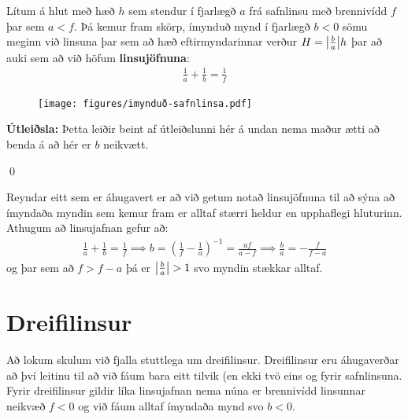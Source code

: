 \ifdefined \wholebook \else\documentclass[oneside]{book}\usepackage{EdlBook}\graphicspath{{figures/}}
\begin{document}
\begin{tcolorbox}
\begin{theorem}
Lítum á hlut með hæð $h$ sem stendur í fjarlægð $a$ frá safnlinsu með brennivídd $f$ þar sem $a < f$. Þá kemur fram skörp, ímynduð mynd í fjarlægð $b < 0$ sömu meginn við linsuna þar sem að hæð eftirmyndarinnar verður $H = \abs{\frac{b}{a}}h$ þar að auki sem að við höfum \textbf{linsujöfnuna}:
\begin{align*}
    \frac{1}{a} + \frac{1}{b} = \frac{1}{f}
\end{align*}
\begin{figure}[H]
    \centering
    \texttt{[image: figures/imynduð-safnlinsa.pdf]}
\end{figure}
\end{theorem}
\end{tcolorbox}

\textbf{Útleiðsla:} Þetta leiðir beint af útleiðslunni hér á undan nema maður ætti að benda á að hér er $b$ neikvætt.

\qed

Reyndar eitt sem er áhugavert er að við getum notað linsujöfnuna til að sýna að ímyndaða myndin sem kemur fram er alltaf stærri heldur en upphaflegi hluturinn. Athugum að linsujafnan gefur að:
\begin{align*}
    \frac{1}{a} + \frac{1}{b} = \frac{1}{f} \implies b = \left( \frac{1}{f} - \frac{1}{a} \right)^{-1} = \frac{af}{a-f} \implies \frac{b}{a} = -\frac{f}{f-a}
\end{align*}
og þar sem að $f > f-a$ þá er $\abs{\frac{b}{a}} > 1$ svo myndin stækkar alltaf.


\section{Dreifilinsur}

Að lokum skulum við fjalla stuttlega um dreifilinsur. Dreifilinsur eru áhugaverðar að því leitinu til að við fáum bara eitt tilvik (en ekki tvö eins og fyrir safnlinsuna. Fyrir dreifilinsur gildir líka linsujafnan nema núna er brennivídd linsunnar neikvæð $f < 0$ og við fáum alltaf ímyndaða mynd svo $b < 0$.
\end{document}
